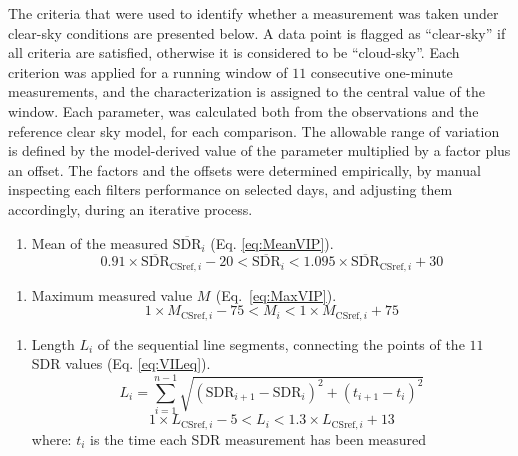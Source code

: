 \documentclass[
]{article}
\providecommand{\tightlist}{%
  \setlength{\itemsep}{0pt}\setlength{\parskip}{0pt}}
\begin{document}
The criteria that were used to identify whether a measurement was taken
under clear-sky conditions are presented below.
A data point is flagged
as ``clear-sky'' if all criteria are satisfied, otherwise it is considered to be ``cloud-sky''.
Each criterion was applied
for a running window of \(11\) consecutive one-minute measurements, and
the characterization is assigned to the central value of the window.
Each parameter, was calculated both from the observations and the
reference clear sky model, for each comparison.
The allowable range of variation is defined by the
model-derived value of the parameter multiplied by a factor plus an
offset.
The factors and the offsets were
determined empirically, by manual inspecting each filters performance on
selected days, and adjusting them accordingly, during an iterative
process.

\begin{enumerate}
\def\labelenumi{\alph{enumi})}
\tightlist
\item
  Mean of the measured \(\overline{\text{SDR}}_i\) (Eq. \ref{eq:MeanVIP}).
  \begin{equation}
  0.91 \times \overline{\text{SDR}}_{\text{CSref},i} - 20
  < \overline{\text{SDR}}_i <
  1.095 \times \overline{\text{SDR}}_{\text{CSref},i} + 30
  \label{eq:MeanVIP}
  \end{equation}
\end{enumerate}

\begin{enumerate}
\def\labelenumi{\alph{enumi})}
\setcounter{enumi}{1}
\tightlist
\item
  Maximum measured value \(M_{\text{}}\) (Eq.~\ref{eq:MaxVIP}).
  \begin{equation}
  1 \times M_{\text{CSref},i} - 75
  < M_{\text{}i} <
  1 \times M_{\text{CSref},i} + 75
  \label{eq:MaxVIP}
  \end{equation}
\end{enumerate}

\begin{enumerate}
\def\labelenumi{\alph{enumi})}
\setcounter{enumi}{2}
\tightlist
\item
  Length \(L_i\) of the sequential line segments, connecting the points of the \(11\) SDR values (Eq. \ref{eq:VILeq}).
  \begin{equation}
  L_i = \sum_{i=1}^{n-1}\sqrt{\left ( \text{SDR}_{i+1} - \text{SDR}_{i}\right )^2 + \left ( t_{i+1} - t_i \right )^2}
  \label{eq:VILeq}
  \end{equation}
  \begin{equation}
  1 \times L_{\text{CSref},i} - 5 < L_i < 1.3 \times L_{\text{CSref},i} + 13
  \label{eq:VILcr}
  \end{equation}
  where: \(t_i\) is the time each SDR measurement has been measured
\end{enumerate}
\end{document}
